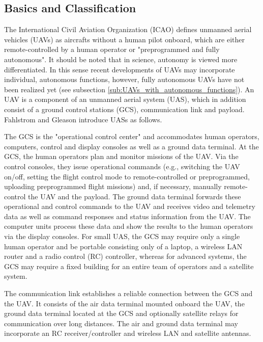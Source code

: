 \subsection{Basics and Classification} \label{sub:basics_n_classification}%
The International Civil Aviation Organization (ICAO) \cite{ICAO2005} defines unmanned aerial vehicles (UAVs) as aircrafts without a human pilot onboard,
which are either remote-controlled by a human operator or "preprogrammed and fully autonomous".
It should be noted that in science, autonomy is viewed more differentiated.
In this sense recent developments of UAVs may incorporate individual, autonomous functions, 
however, fully autonomous UAVs have not been realized yet (see subsection \ref{sub:UAVs_with_autonomous_functions}).
An UAV is a component of an unmanned aerial system (UAS), which in addition consist of a ground control stations (GCS), communication link and payload.
Fahlstrom and Gleason \cite{Fahlstrom2012} introduce UASs as follows.

The GCS is the "operational control center" and accommodates
human operators, computers, control and display consoles as well as a ground data terminal.
At the GCS, the human operators plan and monitor missions of the UAV. 
Via the control consoles, they issue operational commands 
(e.g., switching the UAV on/off, setting the flight control mode to remote-controlled or preprogrammed, uploading preprogrammed flight missions) 
and, if necessary, manually remote-control the UAV and the payload.
The ground data terminal forwards these operational and control commands to the UAV and
receives video and telemetry data as well as command responses and status information from the UAV.
The computer units process these data and show the results to the human operators via the display consoles.
For small UAS, the GCS may require only a single human operator and be portable consisting only of a laptop, a wireless LAN router and a radio control (RC) controller,
whereas for advanced systems, the GCS may require a fixed building for an entire team of operators and a satellite system.

The communication link establishes a reliable connection between the GCS and the UAV. 
It consists of the air data terminal mounted onboard the UAV, the ground data terminal located at the GCS and 
optionally satellite relays for communication over long distances. 
The air and ground data terminal may incorporate an RC receiver/controller and wireless LAN and satellite antennas. 

